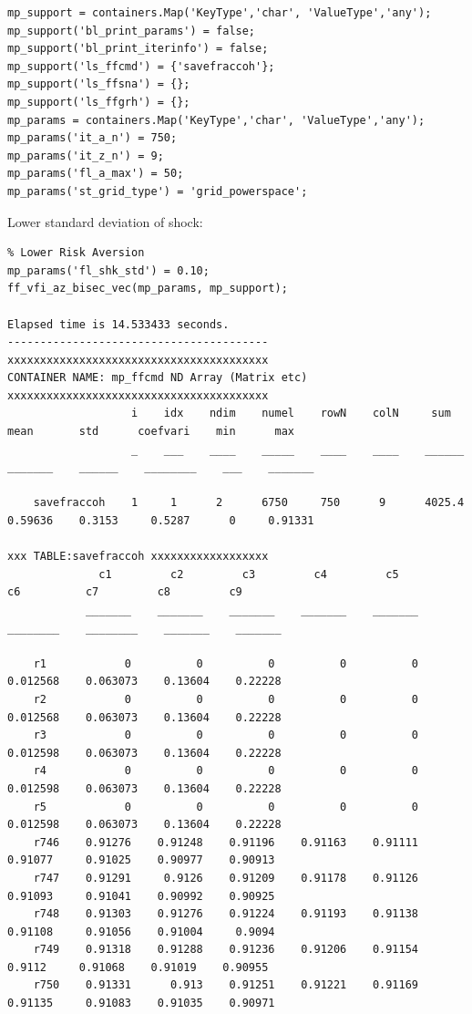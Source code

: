 \documentclass[
]{book}
\begin{document}
\begin{verbatim}
mp_support = containers.Map('KeyType','char', 'ValueType','any');
mp_support('bl_print_params') = false;
mp_support('bl_print_iterinfo') = false;
mp_support('ls_ffcmd') = {'savefraccoh'};
mp_support('ls_ffsna') = {};
mp_support('ls_ffgrh') = {};
mp_params = containers.Map('KeyType','char', 'ValueType','any');
mp_params('it_a_n') = 750;
mp_params('it_z_n') = 9;
mp_params('fl_a_max') = 50;
mp_params('st_grid_type') = 'grid_powerspace';
\end{verbatim}

Lower standard deviation of shock:

\begin{verbatim}
% Lower Risk Aversion
mp_params('fl_shk_std') = 0.10;
ff_vfi_az_bisec_vec(mp_params, mp_support);

Elapsed time is 14.533433 seconds.
----------------------------------------
xxxxxxxxxxxxxxxxxxxxxxxxxxxxxxxxxxxxxxxx
CONTAINER NAME: mp_ffcmd ND Array (Matrix etc)
xxxxxxxxxxxxxxxxxxxxxxxxxxxxxxxxxxxxxxxx
                   i    idx    ndim    numel    rowN    colN     sum       mean       std      coefvari    min      max  
                   _    ___    ____    _____    ____    ____    ______    _______    ______    ________    ___    _______

    savefraccoh    1     1      2      6750     750      9      4025.4    0.59636    0.3153     0.5287      0     0.91331

xxx TABLE:savefraccoh xxxxxxxxxxxxxxxxxx
              c1         c2         c3         c4         c5          c6          c7         c8         c9   
            _______    _______    _______    _______    _______    ________    ________    _______    _______

    r1            0          0          0          0          0    0.012568    0.063073    0.13604    0.22228
    r2            0          0          0          0          0    0.012568    0.063073    0.13604    0.22228
    r3            0          0          0          0          0    0.012598    0.063073    0.13604    0.22228
    r4            0          0          0          0          0    0.012598    0.063073    0.13604    0.22228
    r5            0          0          0          0          0    0.012598    0.063073    0.13604    0.22228
    r746    0.91276    0.91248    0.91196    0.91163    0.91111     0.91077     0.91025    0.90977    0.90913
    r747    0.91291     0.9126    0.91209    0.91178    0.91126     0.91093     0.91041    0.90992    0.90925
    r748    0.91303    0.91276    0.91224    0.91193    0.91138     0.91108     0.91056    0.91004     0.9094
    r749    0.91318    0.91288    0.91236    0.91206    0.91154      0.9112     0.91068    0.91019    0.90955
    r750    0.91331      0.913    0.91251    0.91221    0.91169     0.91135     0.91083    0.91035    0.90971
\end{verbatim}
\end{document}

